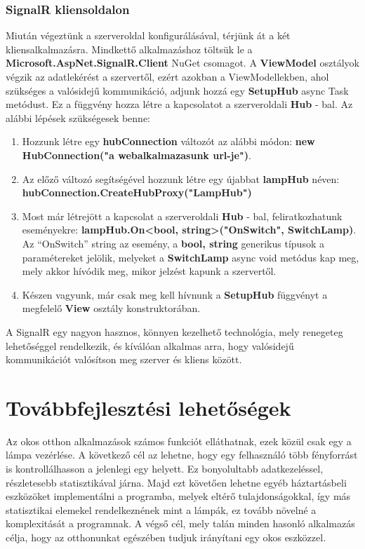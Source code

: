 \documentclass[a4paper,12pt]{report}
\begin{document}
\subsubsection{SignalR kliensoldalon}
    Miután végeztünk a szerveroldal konfigurálásával, térjünk át a két kliensalkalmazásra. Mindkettő alkalmazáshoz töltsük le a
    \textbf{Microsoft.AspNet.SignalR.Client} NuGet csomagot. A \textbf{ViewModel} osztályok végzik az adatlekérést a szervertől,
    ezért azokban a ViewModellekben, ahol szükséges a valósidejű kommunikáció, adjunk hozzá egy \textbf{SetupHub} async Task metódust.
    Ez a függvény hozza létre a kapcsolatot a szerveroldali \textbf{Hub} - bal. Az alábbi lépések szükségesek benne:

\begin{enumerate}
    \item Hozzunk létre egy \textbf{hubConnection} változót az alábbi módon: \textbf{new HubConnection("a webalkalmazasunk url-je")}.
    \item Az előző változó segítségével hozzunk létre egy újabbat \textbf{lampHub} néven: \textbf{hubConnection.CreateHubProxy("LampHub")}
    \item Most már létrejött a kapcsolat a szerveroldali \textbf{Hub} - bal, feliratkozhatunk eseményekre: \textbf{lampHub.On<bool, string>("OnSwitch", SwitchLamp)}.
    Az ``OnSwitch'' string az esemény, a \textbf{bool, string} generikus típusok a paramétereket jelölik, melyeket a \textbf{SwitchLamp}
    async void metódus kap meg, mely akkor hívódik meg, mikor jelzést kapunk a szervertől.
    \item Készen vagyunk, már csak meg kell hívnunk a \textbf{SetupHub} függvényt a megfelelő \textbf{View} osztály konstruktorában.
\end{enumerate}

    A SignalR egy nagyon hasznos, könnyen kezelhető technológia, mely renegeteg lehetőséggel rendelkezik, és kíválóan alkalmas
    arra, hogy valósidejű kommunikációt valósítson meg szerver és kliens között.

\section{Továbbfejlesztési lehetőségek}
    Az okos otthon alkalmazások számos funkciót elláthatnak, ezek közül csak egy a lámpa vezérlése. A következő cél az lehetne,
    hogy egy felhasználó több fényforrást is kontrollálhasson a jelenlegi egy helyett. Ez bonyolultabb adatkezeléssel, részletesebb statisztikával
    járna. Majd ezt követően lehetne egyéb háztartásbeli eszközöket implementálni a programba, melyek eltérő tulajdonságokkal, így
    más statisztikai elemekel rendelkeznének mint a lámpák, ez tovább növelné a komplexitását a programnak. A végső cél, mely
    talán minden hasonló alkalmazás célja, hogy az otthonunkat egészében tudjuk irányítani egy okos eszközzel.\\
\end{document}
